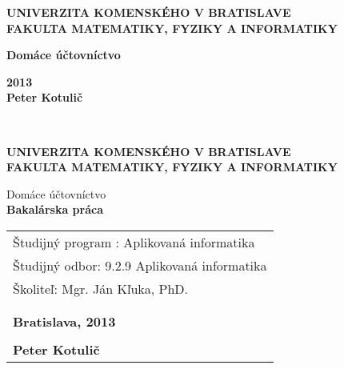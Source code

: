 \documentclass[12pt]{book}
\def\mftitle{Domáce účtovníctvo}
\def\mfthesistype{Bakalárska práca}
\def\mfauthor{Peter Kotulič}
\def\mfadvisor{Mgr. Ján Kľuka, PhD.}
\def\mfplacedate{Bratislava, 2013}
\begin{document}
\frontmatter

\thispagestyle{empty}

\noindent
\begin{minipage}{1\textwidth}
\begin{center}
\large\bf UNIVERZITA KOMENSKÉHO V BRATISLAVE\\
FAKULTA MATEMATIKY, FYZIKY A INFORMATIKY\\
\end{center}
\end{minipage}

\vfill
\begin{minipage}{0.8\textwidth}
\begin{center}
\LARGE\bf\sc\mftitle
\end{center}
\end{minipage}
\vfill
{\large\bf 2013}\\

{\large\bf \mfauthor}
\eject

\thispagestyle{empty}~\vfill\eject

\thispagestyle{empty}

\noindent
\begin{minipage}{1\textwidth}
\begin{center}
\large\bf UNIVERZITA KOMENSKÉHO V BRATISLAVE\\
FAKULTA MATEMATIKY, FYZIKY A INFORMATIKY
\end{center}
\end{minipage}
\vfill
\begin{minipage}{0.8\textwidth}
\begin{center}
\LARGE\sc\mftitle \\
\smallskip
\large\bf\mfthesistype
\end{center}
\end{minipage}
\vfill

\begin{table}[h]
  \begin{tabular}{ l }
	Študijný program : Aplikovaná informatika\\
	Študijný odbor: 9.2.9 Aplikovaná informatika\\
	Školiteľ: \mfadvisor \\
	\\
	\\	
	{\large\bf\mfplacedate}\\
	\\
	{\large\bf\mfauthor}
  \end{tabular}
\end{table}
\end{document}
